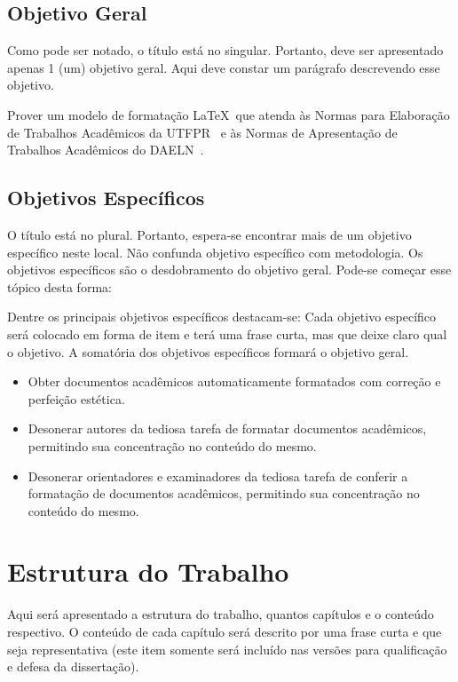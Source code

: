 \subsection{Objetivo Geral}
Como pode ser notado, o título está no singular. Portanto, deve ser apresentado apenas 1 (um) objetivo geral. Aqui deve constar um parágrafo descrevendo esse objetivo.

Prover um modelo de formata\c{c}\~ao \LaTeX\ que atenda \`as Normas para Elabora\c{c}\~ao de Trabalhos Acad\^emicos da UTFPR~\cite{UTFPR2008} e \`as Normas de Apresenta\c{c}\~ao de Trabalhos Acad\^emicos do DAELN~\cite{DAELN2006}.


\subsection{Objetivos Espec\'ificos}

O título está no plural. Portanto, espera-se encontrar mais de um objetivo específico neste local. Não confunda objetivo específico com metodologia. Os objetivos específicos são o desdobramento do objetivo geral. 
Pode-se começar esse tópico desta forma: 

Dentre os principais objetivos específicos destacam-se:
Cada objetivo específico será colocado em forma de item e terá uma frase curta, mas que deixe claro qual o objetivo.
A somatória dos objetivos específicos formará o objetivo geral.

\begin{itemize}
	\item Obter documentos acad\^emicos automaticamente formatados com corre\c{c}\~ao e perfei\c{c}\~ao est\'etica.
	\item Desonerar autores da tediosa tarefa de formatar documentos acad\^emicos, permitindo sua concentra\c{c}\~ao no conte\'udo do mesmo.
	\item Desonerar orientadores e examinadores da tediosa tarefa de conferir a formata\c{c}\~ao de documentos acad\^emicos, permitindo sua concentra\c{c}\~ao no conte\'udo do mesmo.
\end{itemize}

\section{Estrutura do Trabalho}

Aqui será apresentado a estrutura do trabalho, quantos capítulos e o conteúdo respectivo. O conteúdo de cada capítulo será descrito por uma frase curta e que seja representativa (este item somente será incluído nas versões para qualificação e defesa da dissertação). 
